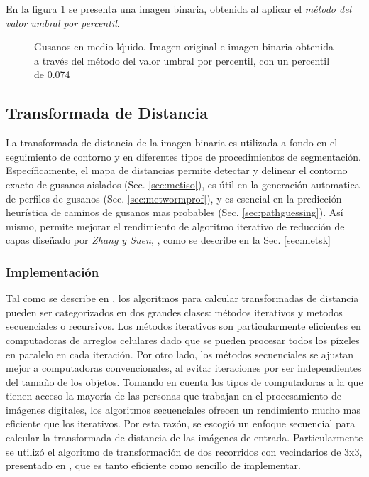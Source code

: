 En la figura \ref{fig:wormthres} se presenta una imagen binaria, obtenida al
aplicar el \emph{m\'etodo del valor umbral por percentil}.

\begin{figure}[h t b p ! H]
  \centering
\qquad
\caption{Gusanos en medio l\'quido. Imagen original e imagen binaria obtenida a trav\'es
del m\'etodo del valor umbral por percentil, con un percentil de 0.074}
  \label{fig:wormthres}
\end{figure}

\subsection{Transformada de Distancia}
\label{sec:metdt}

La transformada de distancia de la imagen binaria es utilizada a fondo en el
seguimiento de contorno y en diferentes tipos de procedimientos de segmentaci\'on.
Espec\'ificamente, el mapa de distancias permite detectar y delinear el contorno
exacto de gusanos aislados (Sec. \ref{sec:metiso}), es \'util en la generaci\'on
automatica de perfiles de gusanos (Sec. \ref{sec:metwormprof}), y es esencial en 
la predicci\'on heur\'istica de caminos de gusanos mas probables (Sec. \ref{sec:pathguessing}). 
As\'i mismo, permite mejorar el rendimiento de algoritmo iterativo de reducci\'on de capas
dise\~nado por \emph{Zhang y Suen}, \cite{thinning}, como se describe en 
la Sec. \ref{sec:metsk}

\subsubsection*{Implementaci\'on}
\label{sec:dtimp}

Tal como se describe en \cite[p.196]{fastdt}, los algoritmos para calcular transformadas de distancia pueden ser
categorizados en dos grandes clases: m\'etodos iterativos y metodos secuenciales o recursivos. 
Los m\'etodos iterativos son particularmente eficientes en computadoras de arreglos celulares
dado que se pueden procesar todos los p\'ixeles en paralelo en cada iteraci\'on. Por otro lado, los m\'etodos secuenciales
se ajustan mejor a computadoras convencionales, al evitar iteraciones por ser independientes del tama\~no de los objetos.
Tomando en cuenta los tipos de computadoras a la que tienen acceso la mayor\'ia de las personas que trabajan
en el procesamiento de im\'agenes digitales, los algoritmos secuenciales ofrecen un rendimiento mucho mas
eficiente que los iterativos. Por esta raz\'on, se escogi\'o un enfoque secuencial para calcular la 
transformada de distancia de las im\'agenes de entrada. Particularmente se utiliz\'o el algoritmo de
transformaci\'on de dos recorridos con vecindarios de 3x3, presentado en \cite{fastdt}, que es
tanto eficiente como sencillo de implementar.\\

